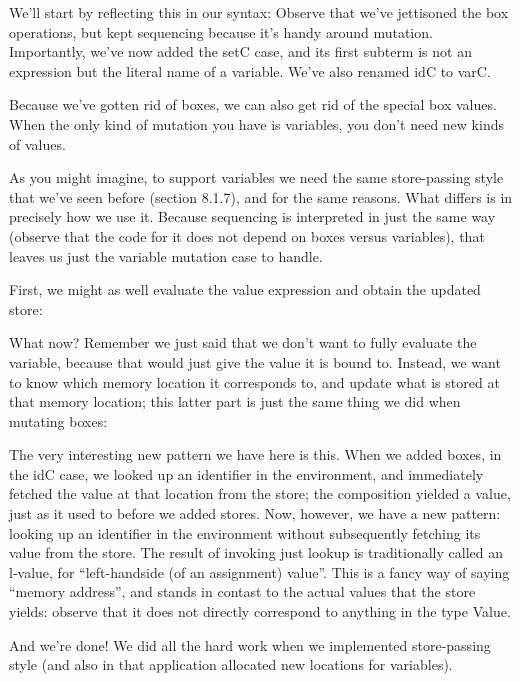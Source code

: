 
We’ll start by reflecting this in our syntax:
Observe that we’ve jettisoned the box operations, but kept sequencing because
it’s handy around mutation. Importantly, we’ve now added the setC case, and its
first subterm is not an expression but the literal name of a variable. We’ve
also renamed idC to varC.

Because we’ve gotten rid of boxes, we can also get rid of the special box
values. When the only kind of mutation you have is variables, you don’t need new
kinds of values.

As you might imagine, to support variables we need the same store-passing style
that we’ve seen before (section 8.1.7), and for the same reasons. What differs
is in precisely how we use it. Because sequencing is interpreted in just the
same way (observe that the code for it does not depend on boxes versus
variables), that leaves us just the variable mutation case to handle.

First, we might as well evaluate the value expression and obtain the updated
store:

What now? Remember we just said that we don’t want to fully evaluate the
variable, because that would just give the value it is bound to. Instead, we
want to know which memory location it corresponds to, and update what is stored
at that memory location; this latter part is just the same thing we did when
mutating boxes:

The very interesting new pattern we have here is this. When we added boxes, in
the idC case, we looked up an identifier in the environment, and immediately
fetched the value at that location from the store; the composition yielded a
value, just as it used to before we added stores. Now, however, we have a new
pattern: looking up an identifier in the environment without subsequently
fetching its value from the store. The result of invoking just lookup is
traditionally called an l-value, for “left-handside (of an assignment) value”.
This is a fancy way of saying “memory address”, and stands in contast to the
actual values that the store yields: observe that it does not directly
correspond to anything in the type Value.

And we’re done! We did all the hard work when we implemented store-passing style
(and also in that application allocated new locations for variables).

